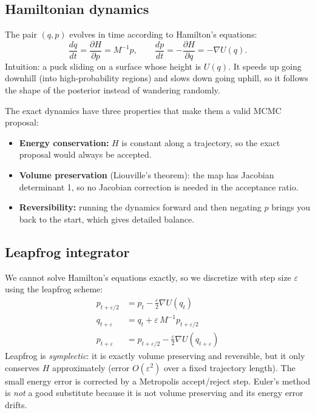 \documentclass[11pt]{article}
\begin{document}
\subsection{Hamiltonian dynamics}
The pair $(q, p)$ evolves in time according to Hamilton's equations:
\begin{equation}
    \frac{dq}{dt} = \frac{\partial H}{\partial p} = M^{-1} p, \qquad
    \frac{dp}{dt} = -\frac{\partial H}{\partial q} = -\nabla U(q).
\end{equation}
Intuition: a puck sliding on a surface whose height is $U(q)$. It speeds up going downhill (into high-probability regions) and slows down going uphill, so it follows the shape of the posterior instead of wandering randomly.

The exact dynamics have three properties that make them a valid MCMC proposal:
\begin{itemize}
    \item \textbf{Energy conservation:} $H$ is constant along a trajectory, so the exact proposal would always be accepted.
    \item \textbf{Volume preservation} (Liouville's theorem): the map has Jacobian determinant 1, so no Jacobian correction is needed in the acceptance ratio.
    \item \textbf{Reversibility:} running the dynamics forward and then negating $p$ brings you back to the start, which gives detailed balance.
\end{itemize}

\subsection{Leapfrog integrator}
We cannot solve Hamilton's equations exactly, so we discretize with step size $\varepsilon$ using the leapfrog scheme:
\begin{align}
    p_{t + \varepsilon/2} &= p_t - \tfrac{\varepsilon}{2} \nabla U(q_t) \\
    q_{t + \varepsilon} &= q_t + \varepsilon\, M^{-1} p_{t + \varepsilon/2} \\
    p_{t + \varepsilon} &= p_{t + \varepsilon/2} - \tfrac{\varepsilon}{2} \nabla U(q_{t + \varepsilon})
\end{align}
Leapfrog is \emph{symplectic}: it is exactly volume preserving and reversible, but it only conserves $H$ approximately (error $O(\varepsilon^2)$ over a fixed trajectory length). The small energy error is corrected by a Metropolis accept/reject step. Euler's method is \emph{not} a good substitute because it is not volume preserving and its energy error drifts.
\end{document}
